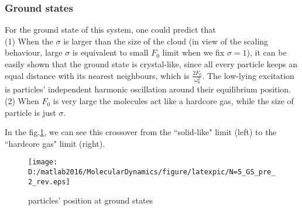 \documentclass[aps,pre,twocolumn,groupedaddress]{revtex4-1}
\begin{document}
\subsubsection{Ground states}
For the ground state of this system, one could predict that \\(1) When the $\sigma$ is larger than the size of the cloud (in view of the scaling behaviour, large $\sigma$ is equivalent to small $F_0$ limit when we fix $\sigma=1$), it can be easily shown that the ground state is crystal-like, since all every particle keeps an equal distance with its nearest neighbours, which is $\frac{2F_0}{\omega_0^2}$. The low-lying excitation is particles' independent harmonic oscillation around their equilibrium position.\\(2) When $F_0$ is very large the molecules act like a hardcore gas, while the size of particle is just $\sigma$.

In the fig.\ref{fig:GS1}, we can see this crossover from the ``solid-like" limit (left) to the ``hardcore gas" limit (right).

\begin{figure}[hbtp]
\centering
\texttt{[image: D:/matlab2016/MolecularDynamics/figure/latexpic/N=5\_GS\_pre\_2\_rev.eps]}
\caption{particles' position at ground states }
\label{fig:GS1}
\end{figure}


\end{document}
